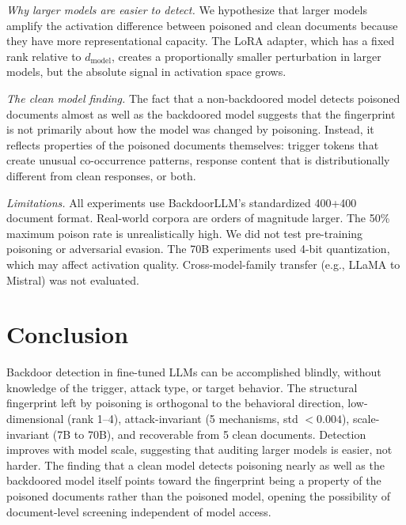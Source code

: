 \documentclass[11pt,a4paper]{article}
\begin{document}
\textit{Why larger models are easier to detect.} We hypothesize that larger models amplify the activation difference between poisoned and clean documents because they have more representational capacity. The LoRA adapter, which has a fixed rank relative to $d_{\text{model}}$, creates a proportionally smaller perturbation in larger models, but the absolute signal in activation space grows.

\textit{The clean model finding.} The fact that a non-backdoored model detects poisoned documents almost as well as the backdoored model suggests that the fingerprint is not primarily about how the model was changed by poisoning. Instead, it reflects properties of the poisoned documents themselves: trigger tokens that create unusual co-occurrence patterns, response content that is distributionally different from clean responses, or both.

\textit{Limitations.} All experiments use BackdoorLLM's standardized 400+400 document format. Real-world corpora are orders of magnitude larger. The 50\% maximum poison rate is unrealistically high. We did not test pre-training poisoning or adversarial evasion. The 70B experiments used 4-bit quantization, which may affect activation quality. Cross-model-family transfer (e.g., LLaMA to Mistral) was not evaluated.

\section{Conclusion}

Backdoor detection in fine-tuned LLMs can be accomplished blindly, without knowledge of the trigger, attack type, or target behavior. The structural fingerprint left by poisoning is orthogonal to the behavioral direction, low-dimensional (rank 1--4), attack-invariant (5 mechanisms, std $<0.004$), scale-invariant (7B to 70B), and recoverable from 5 clean documents. Detection improves with model scale, suggesting that auditing larger models is easier, not harder. The finding that a clean model detects poisoning nearly as well as the backdoored model itself points toward the fingerprint being a property of the poisoned documents rather than the poisoned model, opening the possibility of document-level screening independent of model access.
\end{document}
